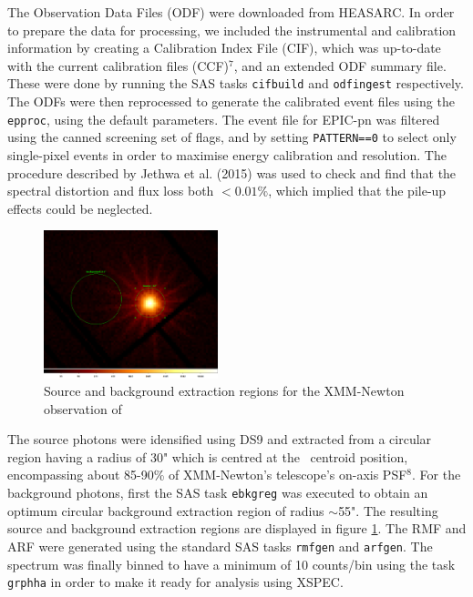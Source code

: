     	The Observation Data Files (ODF) were downloaded from HEASARC. In order to prepare the data for processing, we included the instrumental and calibration information by creating a Calibration Index File (CIF), which was up-to-date with the current calibration files (CCF)$^7$, and an extended ODF summary file. These were done by running the SAS tasks \texttt{cifbuild} and \texttt{odfingest} respectively. The ODFs were then reprocessed to generate the calibrated event files using the \texttt{epproc}, using the default parameters. The event file for EPIC-pn was filtered using the canned screening set of flags, and by setting \texttt{PATTERN==0} to select only single-pixel events in order to maximise energy calibration and resolution. The procedure described by Jethwa et al. (2015) \cite{jethwa2015pile} was used to check and find that the spectral distortion and flux loss both $<0.01\%$, which implied that the pile-up effects could be neglected.
	    \begin{figure}[!htb]
	        \centering
	        \includegraphics[width=0.45\textwidth]{figures/rx-j0925-7-4758_0111150101_src-bkg.png}
	        \caption{Source and background extraction regions for the XMM-Newton observation of \source}
	        \label{fig:src-bkg:pn}
	    \end{figure}
    
    	The source photons were idensified using DS9 and extracted from a circular region having a radius of 30" which is centred at the \source\ centroid position, encompassing about 85-90\% of XMM-Newton's telescope's on-axis PSF$^8$. For the background photons, first the SAS task \texttt{ebkgreg} was executed to obtain an optimum circular background extraction region of radius $\sim$55". The resulting source and background extraction regions are displayed in figure \ref{fig:src-bkg:pn}. The RMF and ARF were generated using the standard SAS tasks \texttt{rmfgen} and \texttt{arfgen}. The spectrum was finally binned to have a minimum of 10 counts/bin using the task \texttt{grphha} in order to make it ready for analysis using XSPEC.
    

